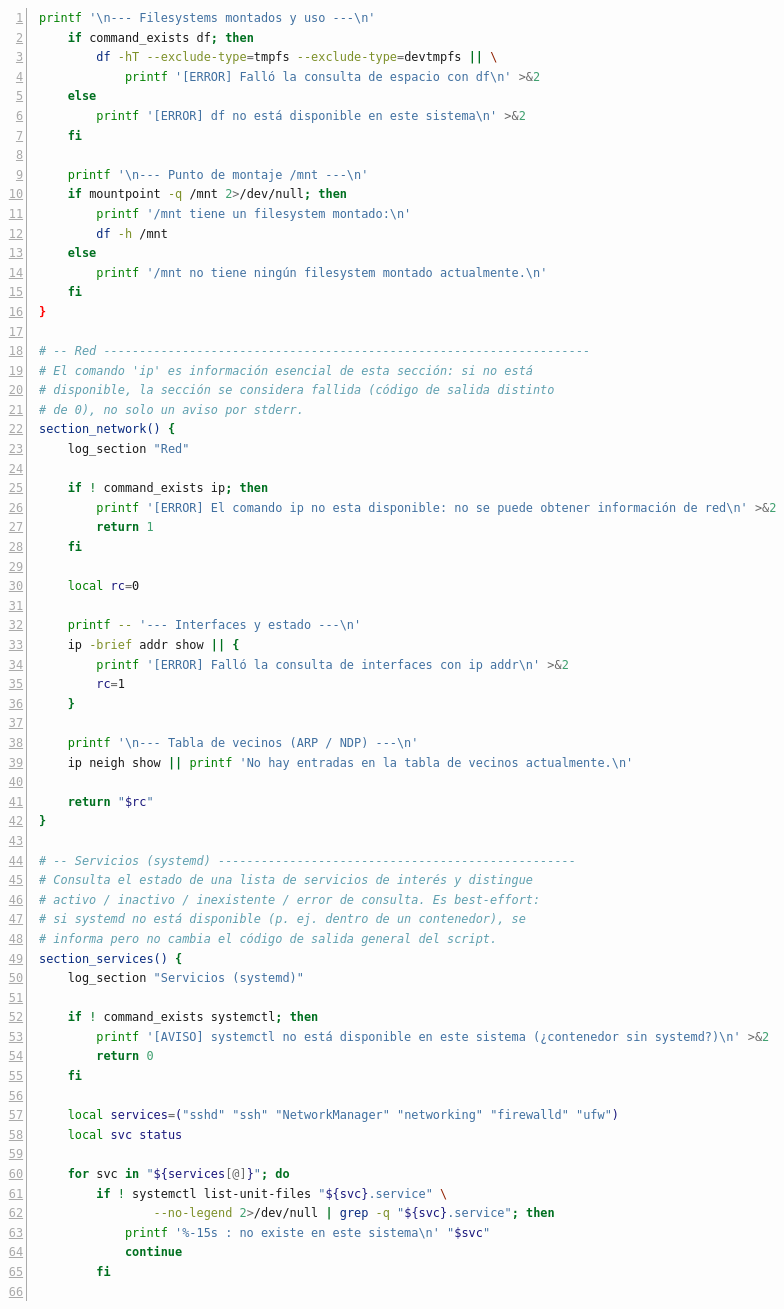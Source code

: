 \documentclass[11pt,a4paper]{article}
\begin{document}
\begin{multicols*}{2}
\begin{lstlisting}[language=bash, basicstyle=\fontsize{5.2pt}{6.0pt}\ttfamily\color{darkslate}, numbers=left, numberstyle=\tiny\color{gray!70}, stepnumber=10, xleftmargin=1.0em]
    printf '\n--- Filesystems montados y uso ---\n'
    if command_exists df; then
        df -hT --exclude-type=tmpfs --exclude-type=devtmpfs || \
            printf '[ERROR] Falló la consulta de espacio con df\n' >&2
    else
        printf '[ERROR] df no está disponible en este sistema\n' >&2
    fi

    printf '\n--- Punto de montaje /mnt ---\n'
    if mountpoint -q /mnt 2>/dev/null; then
        printf '/mnt tiene un filesystem montado:\n'
        df -h /mnt
    else
        printf '/mnt no tiene ningún filesystem montado actualmente.\n'
    fi
}

# -- Red --------------------------------------------------------------------
# El comando 'ip' es información esencial de esta sección: si no está
# disponible, la sección se considera fallida (código de salida distinto
# de 0), no solo un aviso por stderr.
section_network() {
    log_section "Red"

    if ! command_exists ip; then
        printf '[ERROR] El comando ip no esta disponible: no se puede obtener información de red\n' >&2
        return 1
    fi

    local rc=0

    printf -- '--- Interfaces y estado ---\n'
    ip -brief addr show || {
        printf '[ERROR] Falló la consulta de interfaces con ip addr\n' >&2
        rc=1
    }

    printf '\n--- Tabla de vecinos (ARP / NDP) ---\n'
    ip neigh show || printf 'No hay entradas en la tabla de vecinos actualmente.\n'

    return "$rc"
}

# -- Servicios (systemd) --------------------------------------------------
# Consulta el estado de una lista de servicios de interés y distingue
# activo / inactivo / inexistente / error de consulta. Es best-effort:
# si systemd no está disponible (p. ej. dentro de un contenedor), se
# informa pero no cambia el código de salida general del script.
section_services() {
    log_section "Servicios (systemd)"

    if ! command_exists systemctl; then
        printf '[AVISO] systemctl no está disponible en este sistema (¿contenedor sin systemd?)\n' >&2
        return 0
    fi

    local services=("sshd" "ssh" "NetworkManager" "networking" "firewalld" "ufw")
    local svc status

    for svc in "${services[@]}"; do
        if ! systemctl list-unit-files "${svc}.service" \
                --no-legend 2>/dev/null | grep -q "${svc}.service"; then
            printf '%-15s : no existe en este sistema\n' "$svc"
            continue
        fi


\end{lstlisting}
\end{multicols*}
\end{document}
